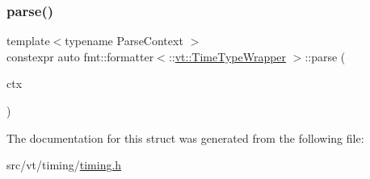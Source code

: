 \mbox{\label{structfmt_1_1formatter_3_1_1vt_1_1_time_type_wrapper_01_4_a0b55006a7d3e54748f7dff24428b384f}} 
\subsubsection{\texorpdfstring{parse()}{parse()}}
{\footnotesize\ttfamily template$<$typename Parse\+Context $>$ \\
constexpr auto fmt\+::formatter$<$\+::\hyperlink{structvt_1_1_time_type_wrapper}{vt\+::\+Time\+Type\+Wrapper} $>$\+::parse (\begin{DoxyParamCaption}\item[{Parse\+Context \&}]{ctx }\end{DoxyParamCaption})\hspace{0.3cm}{\ttfamily [inline]}}



The documentation for this struct was generated from the following file\+:\begin{DoxyCompactItemize}
\item 
src/vt/timing/\hyperlink{timing_8h}{timing.\+h}\end{DoxyCompactItemize}
